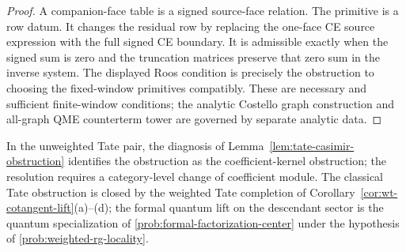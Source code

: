 \documentclass[11pt]{memoir}
\begin{document}
\begin{proof}
  A companion-face table is a signed source-face relation.  The primitive
	  is a row datum.  It changes the residual
  row by replacing the one-face CE source expression with the full
  signed CE boundary.  It is admissible exactly when the signed sum is zero
  and the truncation matrices preserve that zero sum in the inverse
  system.  The displayed Roos condition is precisely the obstruction to
  choosing the fixed-window primitives compatibly.  These are necessary
  and sufficient finite-window conditions; the analytic Costello graph
  construction and all-graph QME counterterm tower are governed by
  separate analytic data.
\end{proof}

\begin{prob}\label{prob:tate-coefficient-descendant-lift}
  In the unweighted Tate pair, the diagnosis of
  Lemma~\ref{lem:tate-casimir-obstruction} identifies the obstruction as the
  coefficient-kernel obstruction; the resolution requires a
  category-level change of coefficient module.  The classical Tate
  obstruction is closed by the weighted Tate completion of
  Corollary~\ref{cor:wt-cotangent-lift}(a)--(d); the formal quantum
  lift on the descendant sector is the quantum specialization of
  \ref{prob:formal-factorization-center} under the hypothesis of
  \ref{prob:weighted-rg-locality}.
\end{prob}
\end{document}
